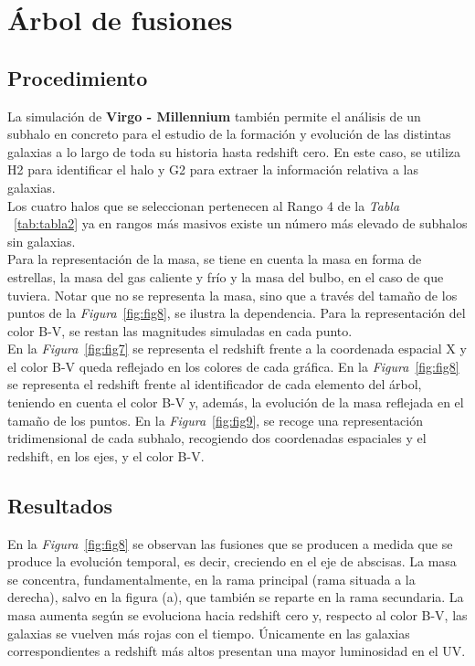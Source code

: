 \section{Árbol de fusiones} 
\label{sec:3} %

\subsection{Procedimiento}
\label{subsec:3_A}

La simulación de \textbf{Virgo - Millennium}\cite{6} también permite el análisis de un subhalo en concreto para el estudio de la formación y evolución de las distintas galaxias a lo largo de toda su historia hasta redshift cero. En este caso, se utiliza H2 para identificar el halo y G2 para extraer la información relativa a las galaxias. \\

Los cuatro halos que se seleccionan pertenecen al Rango 4 de la \textit{Tabla} ~\ref{tab:tabla2} ya en rangos más masivos existe un número más elevado de subhalos sin galaxias. \\

Para la representación de la masa, se tiene en cuenta la masa en forma de estrellas, la masa del gas caliente y frío y la masa del bulbo, en el caso de que tuviera. Notar que no se representa la masa, sino que a través del tamaño de los puntos de la \textit{Figura}~\ref{fig:fig8}, se ilustra la dependencia. Para la representación del color B-V, se restan las magnitudes simuladas en cada punto. \\

En la \textit{Figura}~\ref{fig:fig7} se representa el redshift frente a la coordenada espacial X y el color B-V queda reflejado en los colores de cada gráfica. En la \textit{Figura}~\ref{fig:fig8} se representa el redshift frente al identificador de cada elemento del árbol, teniendo en cuenta el color B-V y, además, la evolución de la masa reflejada en el tamaño de los puntos. En la \textit{Figura}~\ref{fig:fig9}, se recoge una representación tridimensional de cada subhalo, recogiendo dos coordenadas espaciales y el redshift, en los ejes, y el color B-V. \\

\subsection{Resultados}
\label{subsec:3_B}

En la \textit{Figura}~\ref{fig:fig8} se observan las fusiones que se producen a medida que se produce la evolución temporal, es decir, creciendo en el eje de abscisas. La masa se concentra, fundamentalmente, en la rama principal (rama situada a la derecha), salvo en la figura (a), que también se reparte en la rama secundaria. La masa aumenta según se evoluciona hacia redshift cero y, respecto al color B-V, las galaxias se vuelven más rojas con el tiempo. Únicamente en las galaxias correspondientes a redshift más altos presentan una mayor luminosidad en el UV. \\



